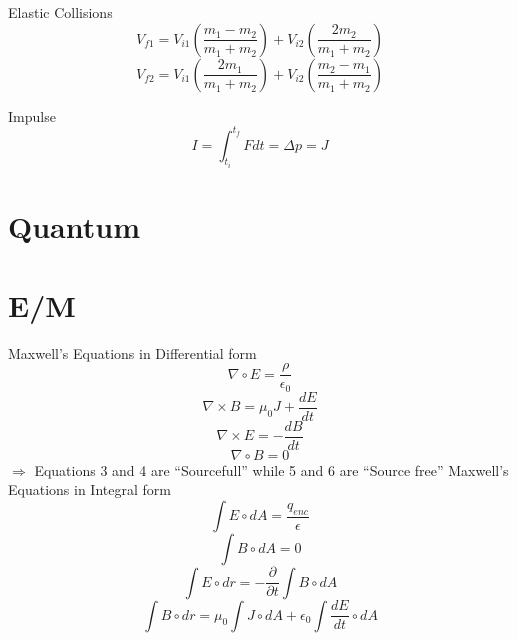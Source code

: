 \documentclass{article}
\begin{document}
Elastic Collisions\begin{equation}V_{f1}=V_{i1}(\frac{m_1-m_2}{m_1+m_2})+V_{i2}(\frac{2m_2}{m_1+m_2})\end{equation}
\begin{equation}V_{f2}=V_{i1}(\frac{2m_1}{m_1+m_2})+V_{i2}(\frac{m_2-m_1}{m_1+m_2})\end{equation}

Impulse\begin{equation}I = \int_{t_i}^{t_f} Fdt = \Delta p = J \end{equation}









\section{Quantum}









\section{E/M}
Maxwell's Equations in Differential form
\begin{equation}\nabla \circ E=\frac{\rho}{\epsilon_0}\end{equation}
\begin{equation}\nabla \times B=\mu_0 J + \frac{dE}{dt}\end{equation}
\begin{equation}\nabla \times E=-\frac{dB}{dt}\end{equation}
\begin{equation}\nabla \circ B=0\end{equation}
$\Rightarrow$ Equations 3 and 4 are ``Sourcefull'' while 5 and 6 are ``Source free''
Maxwell's Equations in Integral form
\begin{equation}\int E \circ dA=\frac{q_{enc}}{\epsilon}\end{equation}
\begin{equation}\int B \circ dA=0\end{equation}
\begin{equation}\int E \circ dr=-\frac{\partial}{\partial t}\int B \circ dA \end{equation}
\begin{equation}\int B \circ dr=\mu_0 \int J \circ dA + \epsilon_0 \int \frac{dE}{dt}\circ dA\end{equation}
\end{document}
